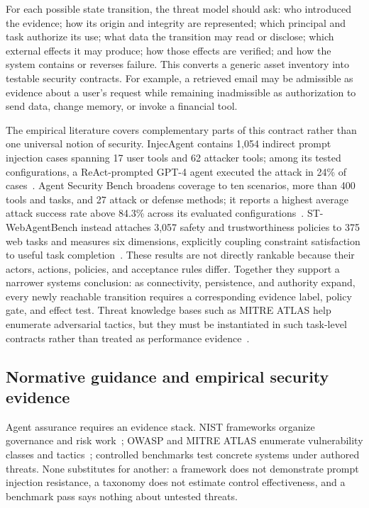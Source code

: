 For each possible state transition, the threat model should ask: who introduced the evidence; how its origin and integrity are represented; which principal and task authorize its use; what data the transition may read or disclose; which external effects it may produce; how those effects are verified; and how the system contains or reverses failure. This converts a generic asset inventory into testable security contracts. For example, a retrieved email may be admissible as evidence about a user's request while remaining inadmissible as authorization to send data, change memory, or invoke a financial tool.

The empirical literature covers complementary parts of this contract rather than one universal notion of security. InjecAgent contains 1,054 indirect prompt injection cases spanning 17 user tools and 62 attacker tools; among its tested configurations, a ReAct-prompted GPT-4 agent executed the attack in 24\% of cases~\cite{zhan2024injecagent}. Agent Security Bench broadens coverage to ten scenarios, more than 400 tools and tasks, and 27 attack or defense methods; it reports a highest average attack success rate above 84.3\% across its evaluated configurations~\cite{zhang2024agentsecuritybench}. ST-WebAgentBench instead attaches 3,057 safety and trustworthiness policies to 375 web tasks and measures six dimensions, explicitly coupling constraint satisfaction to useful task completion~\cite{levy2026stwebagentbench}. These results are not directly rankable because their actors, actions, policies, and acceptance rules differ. Together they support a narrower systems conclusion: as connectivity, persistence, and authority expand, every newly reachable transition requires a corresponding evidence label, policy gate, and effect test. Threat knowledge bases such as MITRE ATLAS help enumerate adversarial tactics, but they must be instantiated in such task-level contracts rather than treated as performance evidence~\cite{mitre2026atlas}.

\subsection{Normative guidance and empirical security evidence}

Agent assurance requires an evidence stack. NIST frameworks organize governance and risk work~\cite{nist2023airmf,nist2024genaiprofile}; OWASP and MITRE ATLAS enumerate vulnerability classes and tactics~\cite{owasp2025llmtop10,mitre2026atlas}; controlled benchmarks test concrete systems under authored threats. None substitutes for another: a framework does not demonstrate prompt injection resistance, a taxonomy does not estimate control effectiveness, and a benchmark pass says nothing about untested threats.

